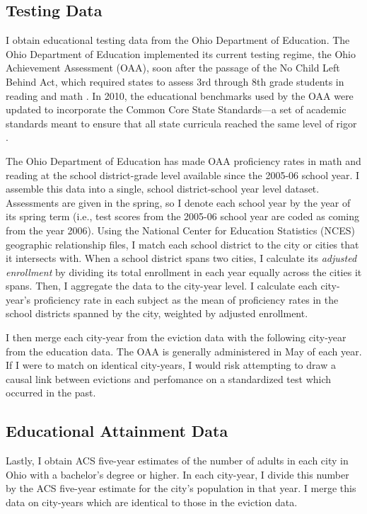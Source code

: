 \documentclass[12pt]{article}
\begin{document}
\subsection{Testing Data}
I obtain educational testing data from the Ohio Department of Education. The Ohio Department of Education implemented its current testing regime, the Ohio Achievement Assessment (OAA), soon after the passage of the No Child Left Behind Act, which required states to assess 3rd through 8th grade students in reading and math \citep{fox_examination_2014}. In 2010, the educational benchmarks used by the OAA were updated to incorporate the Common Core State Standards—a set of academic standards meant to ensure that all state curricula reached the same level of rigor \citep{ohio_school_boards_association_ohios_2010}.

The Ohio Department of Education has made OAA proficiency rates in math and reading at the school district-grade level available since the 2005-06 school year. I assemble this data into a single, school district-school year level dataset. Assessments are given in the spring, so I denote each school year by the year of its spring term (i.e., test scores from the 2005-06 school year are coded as coming from the year 2006). Using the National Center for Education Statistics (NCES) geographic relationship files, I match each school district to the city or cities that it intersects with. When a school district spans two cities, I calculate its \textit{adjusted enrollment} by dividing its total enrollment in each year equally across the cities it spans. Then, I aggregate the data to the city-year level. I calculate each city-year's proficiency rate in each subject as the mean of proficiency rates in the school districts spanned by the city, weighted by adjusted enrollment.

I then merge each city-year from the eviction data with the following city-year from the education data. The OAA is generally administered in May of each year. If I were to match on identical city-years, I would risk attempting to draw a causal link between evictions and perfomance on a standardized test which occurred in the past.

\subsection{Educational Attainment Data}
Lastly, I obtain ACS five-year estimates of the number of adults in each city in Ohio with a bachelor's degree or higher. In each city-year, I divide this number by the ACS five-year estimate for the city's population in that year. I merge this data on city-years which are identical to those in the eviction data.
\end{document}
